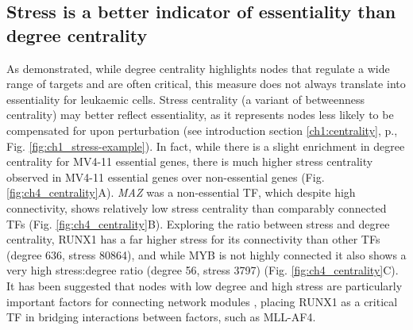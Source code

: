 \subsection{\label{ch4:stress-centrality}Stress is a better indicator of essentiality than degree centrality}

As demonstrated, while degree centrality highlights nodes that regulate a wide range of targets and are often critical, this measure does not always translate into essentiality for leukaemic cells. Stress centrality (a variant of betweenness centrality) may better reflect essentiality, as it represents nodes less likely to be compensated for upon perturbation (see introduction section \ref{ch1:centrality}, p.\pageref{ch1:centrality}, Fig. \ref{fig:ch1_stress-example}). In fact, while there is a slight enrichment in degree centrality for MV4-11 essential genes, there is much higher stress centrality observed in MV4-11 essential genes over non-essential genes (Fig. \ref{fig:ch4_centrality}A). \textit{MAZ} was a non-essential TF, which despite high connectivity, shows relatively low stress centrality than comparably connected TFs (Fig. \ref{fig:ch4_centrality}B). Exploring the ratio between stress and degree centrality, RUNX1 has a far higher stress for its connectivity than other TFs (degree 636, stress 80864), and while MYB is not highly connected it also shows a very high stress:degree ratio (degree 56, stress 3797) (Fig. \ref{fig:ch4_centrality}C). It has been suggested that nodes with low degree and high stress are particularly important factors for connecting network modules \citep{joy_high-betweenness_2005, koschutzki_centrality_2008}, placing RUNX1 as a critical TF in bridging interactions between factors, such as MLL-AF4.

